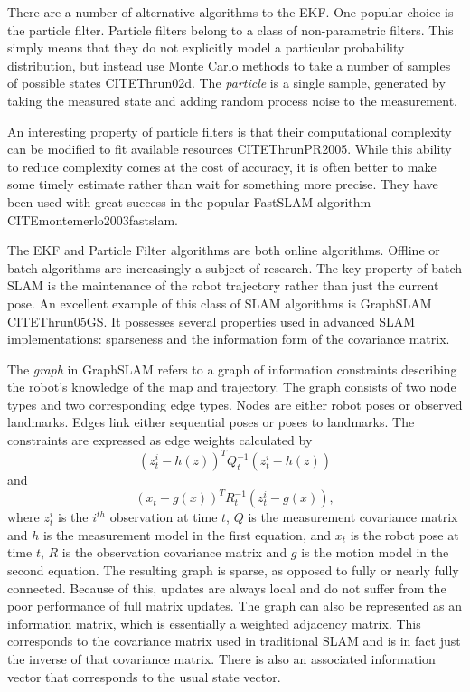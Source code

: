 \documentclass[12pt]{report}
\begin{document}
There are a number of alternative algorithms to the EKF.  One popular choice is the particle filter.  Particle filters belong to a class of non-parametric filters.  This simply means that they do not explicitly model a particular probability distribution, but instead use Monte Carlo methods to take a number of samples of possible states CITE{Thrun02d}.   The \emph{particle} is a single sample, generated by taking the measured state and adding random process noise to the measurement.  

An interesting property of particle filters is that their computational complexity can be modified to fit available resources CITE{ThrunPR2005}.  While this ability to reduce complexity comes at the cost of accuracy, it is often better to make some timely estimate rather than wait for something more precise.  They have been used with great success in the popular FastSLAM algorithm CITE{montemerlo2003fastslam}.

The EKF and Particle Filter algorithms are both online algorithms.  Offline or batch algorithms are increasingly a subject of research.  The key property of batch SLAM is the maintenance of the robot trajectory rather than just the current pose.   An excellent example of this class of SLAM algorithms is GraphSLAM CITE{Thrun05GS}.  It possesses several properties used in advanced SLAM implementations: sparseness and the information form of the covariance matrix.

The \emph{graph} in GraphSLAM refers to a graph of information constraints describing the robot's knowledge of the map and trajectory.  The graph consists of two node types and two corresponding edge types.  Nodes are either robot poses or observed landmarks.  Edges link either sequential poses or poses to landmarks.  The constraints are expressed as edge weights calculated by 
\begin{equation}\label{constraint1}
(z_{t}^{i} - h(z))^TQ_{t}^{-1}(z_{t}^{i} - h(z)) 
\end{equation}
and 
\begin{equation}\label{constraint2}
(x_{t} - g(x))^TR_{t}^{-1}(z_{t}^{i} - g(x)),
\end{equation}
 where $z_t^i$ is the $i^{th}$ observation at time $t$, $Q$ is the measurement covariance matrix and $h$ is the measurement model in the first equation, and $x_{t}$ is the robot pose at time $t$, $R$ is the observation covariance matrix and $g$ is the motion model in the second equation.  The resulting graph is sparse, as opposed to fully or nearly fully connected.  Because of this, updates are always local and do not suffer from the poor performance of full matrix updates.  The graph can also be represented as an information matrix, which is essentially a weighted adjacency matrix.  This corresponds to the covariance matrix used in traditional SLAM and is in fact just the inverse of that covariance matrix.  There is also an associated information vector that corresponds to the usual state vector.  
\end{document}
